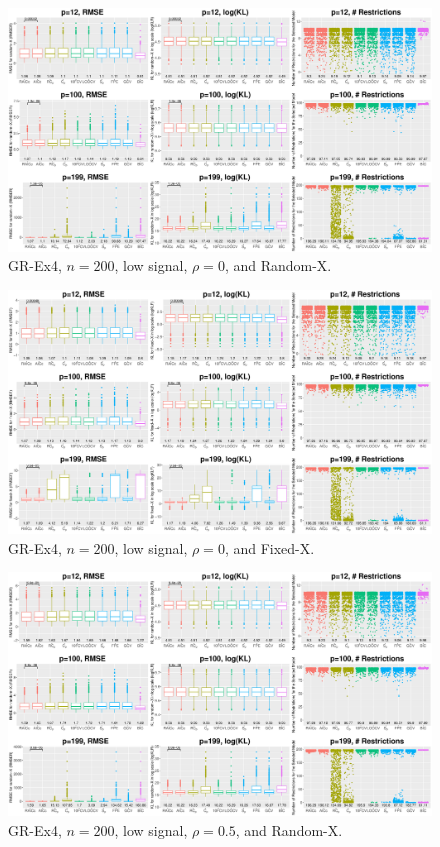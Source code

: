 \clearpage
\begin{figure}[!ht]
\centering
\includegraphics[width=\textwidth]{figures/supplement/randomx_GR-Ex4_n200_lsnr_rho0.eps}
\caption{GR-Ex4, $n=200$, low signal, $\rho=0$, and Random-X.}
\end{figure}
\begin{figure}[!ht]
\centering
\includegraphics[width=\textwidth]{figures/supplement/fixedx_GR-Ex4_n200_lsnr_rho0.eps}
\caption{GR-Ex4, $n=200$, low signal, $\rho=0$, and Fixed-X.}
\end{figure}
\clearpage
\begin{figure}[!ht]
\centering
\includegraphics[width=\textwidth]{figures/supplement/randomx_GR-Ex4_n200_lsnr_rho05.eps}
\caption{GR-Ex4, $n=200$, low signal, $\rho=0.5$, and Random-X.}
\end{figure}
